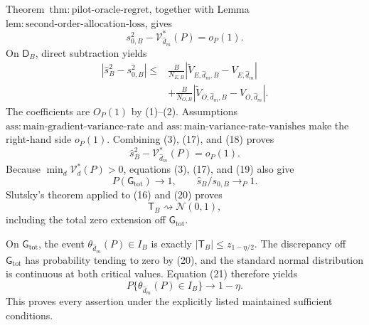 Theorem~\(\mathrm{thm{:}pilot\text{-}oracle\text{-}regret}\), together with Lemma~\(\mathrm{lem{:}second\text{-}order\text{-}allocation\text{-}loss}\), gives
\[
 s_{0,B}^2-\mathcal V_{\widehat d_m}^*(P)=o_P(1).              \tag{17}
\]
On \(\mathsf D_B\), direct subtraction yields
\[
\begin{aligned}
 |\widehat s_B^2-s_{0,B}^2|
 \le{}&\frac{B}{N_{E,B}}
 |\widetilde V_{E,\widehat d_m,B}-V_{E,\widehat d_m}|\\
 &+\frac{B}{N_{O,B}}
 |\widetilde V_{O,\widehat d_m,B}-V_{O,\widehat d_m}|.
\end{aligned}                                                       \tag{18}
\]
The coefficients are \(O_P(1)\) by (1)--(2).  Assumptions~\(\mathrm{ass{:}main\text{-}gradient\text{-}variance\text{-}rate}\) and \(\mathrm{ass{:}main\text{-}variance\text{-}rate\text{-}vanishes}\) make the right-hand side \(o_P(1)\).  Combining (3), (17), and (18) proves
\[
 \widehat s_B^2-\mathcal V_{\widehat d_m}^*(P)=o_P(1).        \tag{19}
\]
Because \(\min_d\mathcal V_d^*(P)>0\), equations (3), (17), and (19) also give
\[
 P(\mathsf G_{\mathrm{tot}})\longrightarrow1,
 \qquad \widehat s_B/s_{0,B}\longrightarrow_P1.              \tag{20}
\]
Slutsky's theorem applied to (16) and (20) proves
\[
 \mathsf T_B\rightsquigarrow\mathcal N(0,1),                 \tag{21}
\]
including the total zero extension off \(\mathsf G_{\mathrm{tot}}\).

On \(\mathsf G_{\mathrm{tot}}\), the event \(\theta_{\widehat d_m}(P)\in I_B\) is exactly \(|\mathsf T_B|\le z_{1-\eta/2}\).  The discrepancy off \(\mathsf G_{\mathrm{tot}}\) has probability tending to zero by (20), and the standard normal distribution is continuous at both critical values.  Equation (21) therefore yields
\[
 P\{\theta_{\widehat d_m}(P)\in I_B\}\longrightarrow1-\eta.
\]
This proves every assertion under the explicitly listed maintained sufficient conditions.